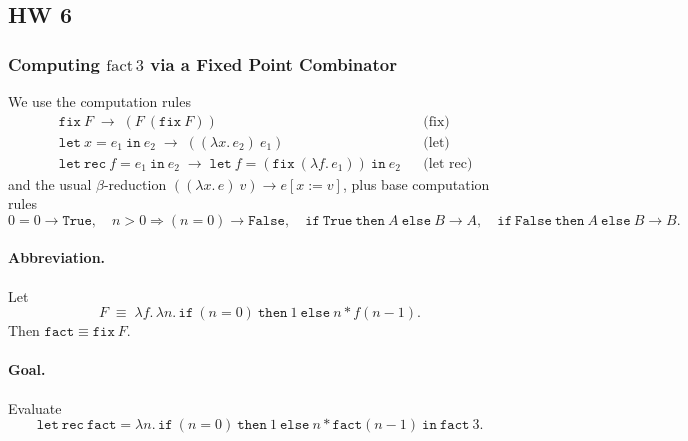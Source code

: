 \documentclass{article}
\theoremstyle{theorem}
\theoremstyle{definition}
\theoremstyle{remark}
\begin{document}
\subsection{HW 6}
\subsubsection{Computing \texorpdfstring{$\mathrm{fact}\,3$}{fact 3} via a Fixed Point Combinator}

We use the computation rules
\[
\begin{aligned}
&\mathtt{fix}\ F \;\to\; (F\ (\mathtt{fix}\ F)) && \text{(fix)}\\
&\mathtt{let}\ x = e_1\ \mathtt{in}\ e_2 \;\to\; ((\lambda x.\, e_2)\ e_1) && \text{(let)}\\
&\mathtt{let\ rec}\ f = e_1\ \mathtt{in}\ e_2 \;\to\; \mathtt{let}\ f = (\mathtt{fix}\ (\lambda f.\, e_1))\ \mathtt{in}\ e_2 && \text{(let rec)}
\end{aligned}
\]
and the usual \(\beta\)-reduction \(((\lambda x.\,e)\ v) \to e[x:=v]\), plus base computation rules
\[
0=0\to \mathtt{True},\quad n{>}0 \Rightarrow (n=0)\to \mathtt{False},\quad
\mathtt{if}\ \mathtt{True}\ \mathtt{then}\ A\ \mathtt{else}\ B \to A,\quad
\mathtt{if}\ \mathtt{False}\ \mathtt{then}\ A\ \mathtt{else}\ B \to B.
\]

\paragraph{Abbreviation.}
Let
\[
F \;\equiv\; \lambda f.\,\lambda n.\,
\mathtt{if}\ (n=0)\ \mathtt{then}\ 1\ \mathtt{else}\ n * f(n-1).
\]
Then \(\mathtt{fact} \equiv \mathtt{fix}\ F\).

\paragraph{Goal.}
Evaluate
\[
\mathtt{let\ rec}\ \mathtt{fact} = \lambda n.\,\mathtt{if}\ (n=0)\ \mathtt{then}\ 1\ \mathtt{else}\ n * \mathtt{fact}(n-1)\ \mathtt{in}\ \mathtt{fact}\ 3.
\]
\end{document}

